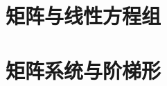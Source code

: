 \documentclass[10pt, a4paper]{article}
\begin{document}
\ucascover

\tableofcontents
\newpage


\section{矩阵与线性方程组}








\section{矩阵系统与阶梯形}







\end{document}
